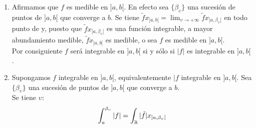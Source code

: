 \begin{enumerate}
\item Afirmamos que $f$ es medible en $]a,b[$. En efecto sea $\lbrace \beta_\upsilon \rbrace$ una sucesión de puntos de $]a,b[$ que converge a $b$. Se tiene $\tilde{f}x_{]a,b[}=\lim_{\upsilon \to +\infty}\tilde{f}x_{]a,\beta_\upsilon[}$ en todo punto de \R \phantom{} y, puesto que $\tilde{f}x_{]a,\beta_\upsilon[}$ es una función integrable, a mayor abundamiento medible, $\tilde{f}x_{]a,b[}$ es medible, o sea $f$ es medible en $]a,b[$.\\
Por consiguiente $f$ será integrable en $]a,b[$ si y sólo si $|f|$ es integrable en $]a,b[$.
\item Supongamos $f$ integrable en $]a,b[$, equivalentemente $|f$ integrable en $]a,b[$. Sea  $\lbrace \beta_\upsilon \rbrace$ una sucesión de puntos de $]a,b[$ que converge a $b$.\\
Se tiene \todo $\upsilon$:\\
\begin{equation}
\int_a^{\beta_\upsilon}|f|=\int_{\mathbb{R}} |\tilde{f}|x_{]a,\beta_\upsilon[}
\end{equation}


\end{enumerate}
